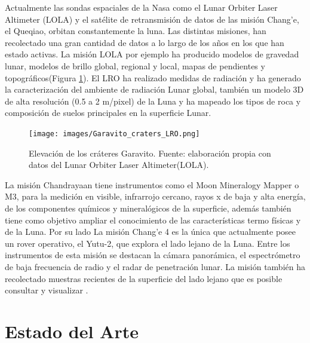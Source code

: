 \documentclass[12pt]{article}
\begin{document}
Actualmente las sondas espaciales de la Nasa como el Lunar Orbiter Laser Altimeter (LOLA) y 
el satélite de retransmisión 
de datos de las misión Chang'e, el Queqiao, orbitan constantemente la luna.
Las distintas misiones, han recolectado una gran cantidad de datos a lo largo de los años en los que han 
estado activas. La misión LOLA por ejemplo ha producido modelos de gravedad lunar, modelos de brillo global, 
regional y local, mapas de pendientes y topográficos(Figura \ref{fig:elevacion_luna}). El LRO ha 
realizado medidas de radiación y ha generado la caracterización del ambiente de radiación Lunar global, 
también un modelo 3D de alta resolución (0.5 a 2 m/pixel) de la Luna y ha mapeado los tipos de roca 
y composición de suelos principales en la superficie Lunar. 
\begin{figure}[H]
    \texttt{[image: images/Garavito\_craters\_LRO.png]}
    \centering
    \caption{Elevación de los cráteres Garavito.
    Fuente: elaboración propia con datos del Lunar Orbiter Laser Altimeter(LOLA).}
    \label{fig:elevacion_luna}
\end{figure}
La misión Chandrayaan tiene instrumentos como el Moon Mineralogy Mapper o M3, para la medición en 
visible, infrarrojo cercano, rayos x de baja y alta energía, de los componentes químicos y mineralógicos de 
la superficie, además también tiene como objetivo ampliar el conocimiento de las características termo físicas 
y de la Luna. Por su lado La misión Chang'e 4 es la única que actualmente posee un rover operativo, 
el Yutu-2, que explora el lado lejano de la Luna. Entre los instrumentos de esta misión se destacan la 
cámara panorámica, el espectrómetro de baja frecuencia de radio y el radar de penetración lunar. 
La misión también ha recolectado muestras recientes  de la superficie del lado lejano que es posible 
consultar y visualizar 
\parencite{ZHAO2023115766}.

\section{Estado del Arte}\label{sec:estado_del_arte}
\end{document}

